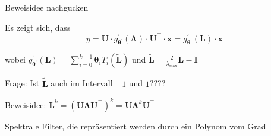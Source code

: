 Beweisidee nachgucken

Es zeigt sich, dass
\begin{equation}
  y = \mathbf{U} \cdot g^{\prime}_{\mathbf{\theta}^{\prime}}\left(\mathbf{\Lambda}\right) \cdot \mathbf{U}^{\top} \cdot \mathbf{x} = g^{\prime}_{\mathbf{\theta}^{\prime}}\left(\mathbf{L}\right) \cdot \mathbf{x}
\end{equation}

wobei $g^{\prime}_{\mathbf{\theta}^{\prime}}\left(\mathbf{L}\right) = \sum_{i=0}^{k-1} \mathbf{\theta}_i T_i\left( \mathbf{\tilde L}\right)$ und $\mathbf{\tilde L} = \frac{2}{\lambda_{\max}}\mathbf{L} - \mathbf{I}$

Frage: Ist $\mathbf{\tilde L}$ auch im Intervall $-1$ und $1$????

Beweisidee: $\mathbf{L}^k = {\left(\mathbf{U}\mathbf{\Lambda}\mathbf{U}^{\top}\right)}^k = \mathbf{U}\mathbf{\Lambda}^k\mathbf{U^{\top}}$


Spektrale Filter, die repräsentiert werden durch ein Polynom vom Grad 
